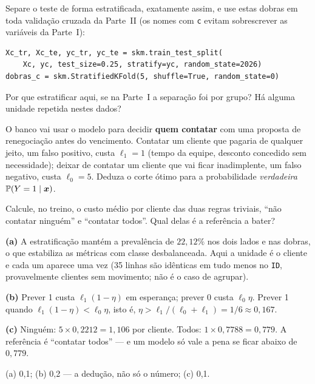 \documentclass[11pt,a4paper]{article}
\newcommand{\cod}[1]{\texttt{#1}}
\begin{document}
\begin{itens}
  \item Separe o teste de forma estratificada, exatamente assim, e use estas
        dobras em toda validação cruzada da Parte~II (os nomes com \cod{c} evitam
        sobrescrever as variáveis da Parte~I):
\begin{lstlisting}
Xc_tr, Xc_te, yc_tr, yc_te = skm.train_test_split(
    Xc, yc, test_size=0.25, stratify=yc, random_state=2026)
dobras_c = skm.StratifiedKFold(5, shuffle=True, random_state=0)
\end{lstlisting}
        Por que estratificar aqui, se na Parte~I a separação foi por grupo? Há alguma
        unidade repetida nestes dados?
  \item O banco vai usar o modelo para decidir \textbf{quem contatar} com uma
        proposta de renegociação antes do vencimento. Contatar um cliente que pagaria
        de qualquer jeito, um falso positivo, custa $\ell_1=1$ (tempo da equipe,
        desconto concedido sem necessidade); deixar de contatar um cliente que vai
        ficar inadimplente, um falso negativo, custa $\ell_0=5$. Deduza o corte ótimo
        para a probabilidade \emph{verdadeira} $\mathbb{P}(Y=1\mid\bm{x})$.
  \item Calcule, no treino, o custo médio por cliente das duas regras triviais,
        ``não contatar ninguém'' e ``contatar todos''. Qual delas é a referência a
        bater?
\end{itens}

\begin{solucao}
\textbf{(a)} A estratificação mantém a prevalência de $22{,}12\%$ nos dois lados e nas
dobras, o que estabiliza as métricas com classe desbalanceada. Aqui a unidade é o
cliente e cada um aparece uma vez (35 linhas são idênticas em tudo menos no
\cod{ID}, provavelmente clientes sem movimento; não é o caso de agrupar).

\textbf{(b)} Prever 1 custa $\ell_1(1-\eta)$ em esperança; prever 0 custa
$\ell_0\eta$. Prever 1 quando $\ell_1(1-\eta)<\ell_0\eta$, isto é,
$\eta>\ell_1/(\ell_0+\ell_1)=1/6\approx0{,}167$.

\textbf{(c)} Ninguém: $5\times0{,}2212=1{,}106$ por cliente. Todos:
$1\times0{,}7788=0{,}779$. A referência é ``contatar todos'' --- e um modelo só vale a
pena se ficar abaixo de $0{,}779$.
\end{solucao}

\begin{criterio}
(a) 0,1; (b) 0,2 --- a dedução, não só o número; (c) 0,1.
\end{criterio}
\end{document}
